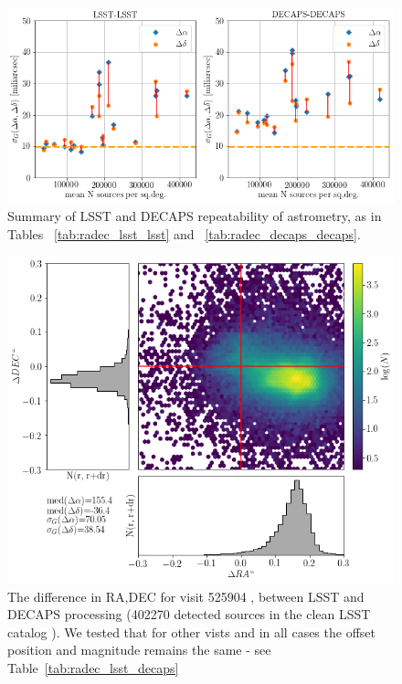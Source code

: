 \documentclass[DM,lsstdraft,toc,usenatbib]{lsstdoc}
\begin{document}
\begin{figure}
\begin{centering}
\includegraphics[width=0.8\columnwidth]{figs/Astrometry_LSST-LSST_DECAPS-DECAPS.png}
\caption{Summary of LSST and DECAPS repeatability of astrometry, as in Tables ~\ref{tab:radec_lsst_lsst} and ~\ref{tab:radec_decaps_decaps}.}
\label{fig:lsst_decaps_side}
\end{centering}
\end{figure} 


\begin{figure}
\begin{centering}
\includegraphics[width=0.8\columnwidth]{figs/22_525904_RA_DEC_offset.png}
\caption{The difference in RA,DEC for visit 525904 , between LSST and DECAPS processing (402270 detected sources in  the clean LSST catalog ). We tested that for other vists and in all cases the offset position and magnitude remains the same - see Table~\ref{tab:radec_lsst_decaps}}
\label{fig:ra_dec_lsst_decaps}
\end{centering}
\end{figure} 
\end{document}
